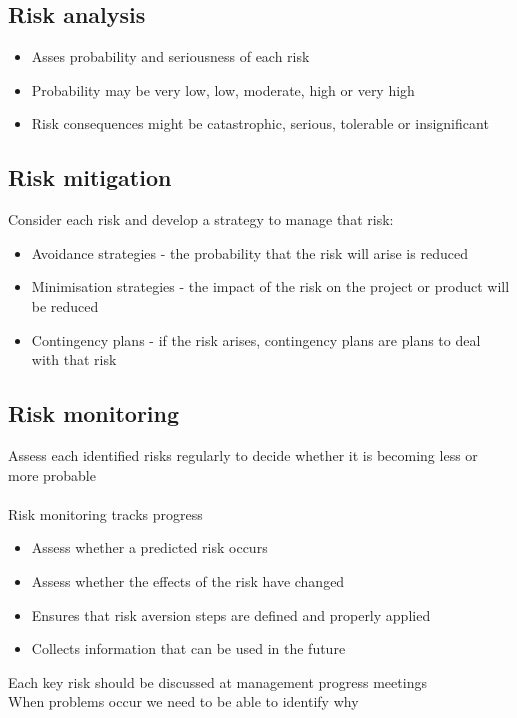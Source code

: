 \documentclass{article}[18pt]
\begin{document}
\subsection{Risk analysis}
\begin{itemize}
	\item Asses probability and seriousness of each risk
	\item Probability may be very low, low, moderate, high or very high
	\item Risk consequences might be catastrophic, serious, tolerable or insignificant
\end{itemize}
\subsection{Risk mitigation}
Consider each risk and develop a strategy to manage that risk:
\begin{itemize}
	\item Avoidance strategies - the probability that the risk will arise is reduced
	\item Minimisation strategies - the impact of the risk on the project or product will be reduced
	\item Contingency plans - if the risk arises, contingency plans are plans to deal with that risk
\end{itemize}
\subsection{Risk monitoring}
Assess each identified risks regularly to decide whether it is becoming less or more probable\\
\\
Risk monitoring tracks progress
\begin{itemize}
	\item Assess whether a predicted risk occurs
	\item Assess whether the effects of the risk have changed
	\item Ensures that risk aversion steps are defined and properly applied
	\item Collects information that can be used in the future
\end{itemize}
Each key risk should be discussed at management progress meetings\\
When problems occur we need to be able to identify why
\end{document}
